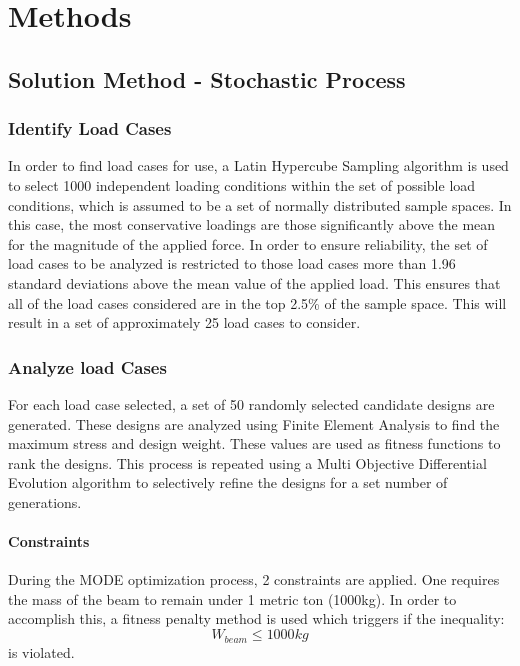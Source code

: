 \chapter{Methods}
\section{Solution Method - Stochastic Process}
\subsection{Identify Load Cases}
In order to find load cases for use, a Latin Hypercube Sampling algorithm is used to select 1000 independent loading conditions within the set of possible load conditions, which is assumed to be a set of normally distributed sample spaces. In this case, the most conservative loadings are those significantly above the mean for the magnitude of the applied force. In order to ensure reliability, the set of load cases to be analyzed is restricted to those load cases more than 1.96 standard deviations above the mean value of the applied load. This ensures that all of the load cases considered are in the top 2.5\% of the sample space. This will result in a set of approximately 25 load cases to consider. 
\subsection{Analyze load Cases} 
For each load case selected, a set of 50 randomly selected candidate designs are generated. These designs are analyzed using Finite Element Analysis to find the maximum stress and design weight. These values are used as fitness functions to rank the designs. This process is repeated using a Multi Objective Differential Evolution algorithm to selectively refine the designs for a set number of generations. 
\subsubsection{Constraints}
During the MODE optimization process, 2 constraints are applied. One requires the mass of the beam to remain under 1 metric ton (1000kg). In order to accomplish this, a fitness penalty method is used which triggers if the inequality:
$$
W_{beam} \leq 1000kg
$$
is violated. 

